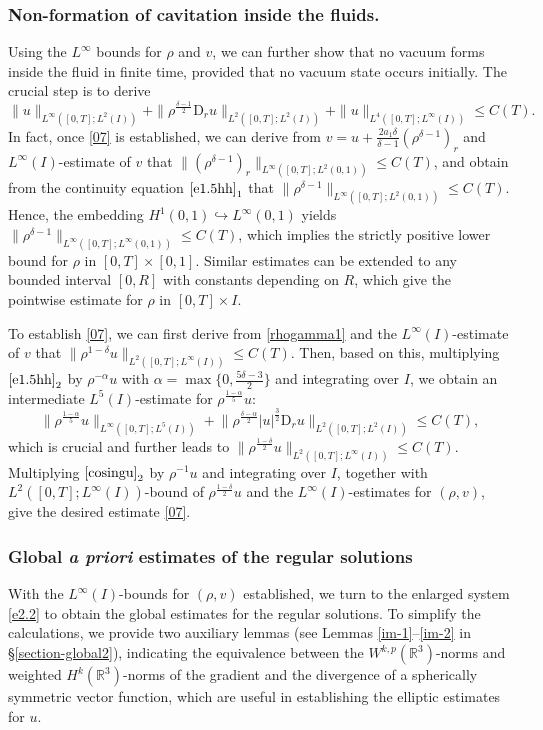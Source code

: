 \documentclass[11pt,reqno]{amsart}
\numberwithin{rk}{section}
\numberwithin{prop}{section}
\numberwithin{mydef}{section}
\numberwithin{lem}{section}
\numberwithin{equation}{section}
\numberwithin{thm}{section}
\begin{document}
\subsubsection{Non-formation of cavitation inside the fluids.}
Using the $L^\infty$ bounds for $\rho$ and $v$, we can further show that no vacuum forms inside the fluid in finite time, provided that no vacuum state occurs initially. The crucial step is to derive
\begin{equation}\label{07}
\|u\|_{L^\infty([0,T];L^2(I))}+\|\rho^\frac{\delta-1}{2}\mathrm{D}_r u\|_{L^2([0,T];L^2(I))}+\|u\|_{L^4([0,T];L^\infty(I))} \leq C(T).
\end{equation}
In fact, once \eqref{07} is established, we can derive from $v=u+\frac{2a_1\delta}{\delta-1}(\rho^{\delta-1})_r$ and $L^\infty(I)$-estimate of $v$ that $\|(\rho^{\delta-1})_r\|_{L^\infty([0,T];L^2(0,1))}\leq C(T)$, and obtain from the continuity equation $\eqref{e1.5hh}_1$ that $\|\rho^{\delta-1}\|_{L^\infty([0,T];L^2(0,1))}\leq C(T)$. Hence, the embedding $H^1(0,1)\hookrightarrow L^\infty(0,1)$ yields $\|\rho^{\delta-1}\|_{L^\infty([0,T];L^\infty(0,1))}\leq C(T)$, which implies the strictly positive lower bound for $\rho$ in $[0,T]\times[0,1]$. Similar estimates can be extended to any bounded interval $[0,R]$ with constants depending on $R$, which give the pointwise estimate for $\rho$ in $[0,T]\times I$.


To establish \eqref{07}, we can first derive from \eqref{rhogamma1} and the $L^\infty(I)$-estimate of $v$ that $\|\rho^{1-\delta}u\|_{L^2([0,T];L^\infty(I))}\leq C(T)$. Then, based on this, multiplying $\eqref{e1.5hh}_2$ by $\rho^{-\alpha} u$ with $\alpha=\max\{0,\frac{5\delta-3}{2}\}$ and integrating over $I$, we obtain an intermediate $L^5(I)$-estimate for $\rho^\frac{1-\alpha}{5}u$:
\begin{equation*}
\big\|\rho^\frac{1-\alpha}{5}u\big\|_{L^\infty([0,T];L^5(I))}
+\big\|\rho^\frac{\delta-\alpha}{2}|u|^\frac{3}{2}\mathrm{D}_r u\big\|_{L^2([0,T];L^2(I))}\leq C(T),
\end{equation*}
which is crucial and further leads to $\|\rho^\frac{1-\delta}{2}u\|_{L^2([0,T];L^\infty(I))}\leq C(T)$. Multiplying $\eqref{cosingu}_2$ by $\rho^{-1}u$ and integrating over $I$, together with $L^2([0,T];L^\infty(I))$-bound of $\rho^\frac{1-\delta}{2}u$ and the $L^\infty(I)$-estimates for $(\rho,v)$, give the desired estimate \eqref{07}.


\subsubsection{Global \textit{a priori} estimates of the regular solutions}
With the $L^\infty(I)$-bounds for $(\rho,v)$ established, we turn to the enlarged system \eqref{e2.2} to obtain the global estimates for the regular solutions. To simplify the calculations, we provide two auxiliary lemmas (see Lemmas \ref{im-1}--\ref{im-2} in \S\ref{section-global2}), indicating the equivalence between the $W^{k,p}(\mathbb{R}^3)$-norms and weighted $H^k(\mathbb{R}^3)$-norms of the gradient and the divergence of a spherically symmetric vector function, which are useful in establishing the elliptic estimates for $u$.
\end{document}
